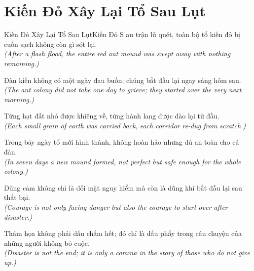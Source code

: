 \section{Kiến Đỏ Xây Lại Tổ Sau Lụt}
\begin{truyen}{Kiến Đỏ Xây Lại Tổ Sau Lụt}{Kiến Đỏ}
S au trận lũ quét, toàn bộ tổ kiến đỏ bị cuốn sạch không còn gì sót lại.\\
\textit{(After a flash flood, the entire red ant mound was swept away with nothing remaining.)}

Đàn kiến không có một ngày đau buồn; chúng bắt đầu lại ngay sáng hôm sau.\\
\textit{(The ant colony did not take one day to grieve; they started over the very next morning.)}

Từng hạt đất nhỏ được khiêng về, từng hành lang được đào lại từ đầu.\\
\textit{(Each small grain of earth was carried back, each corridor re-dug from scratch.)}

Trong bảy ngày tổ mới hình thành, không hoàn hảo nhưng đủ an toàn cho cả đàn.\\
\textit{(In seven days a new mound formed, not perfect but safe enough for the whole colony.)}

Dũng cảm không chỉ là đối mặt nguy hiểm mà còn là dũng khí bắt đầu lại sau thất bại.\\
\textit{(Courage is not only facing danger but also the courage to start over after disaster.)}

\end{truyen}
\begin{baihoc}
  Thảm họa không phải dấu chấm hết; đó chỉ là dấu phẩy trong câu chuyện của những người không bỏ cuộc.\\
  \textit{(Disaster is not the end; it is only a comma in the story of those who do not give up.)}
\end{baihoc}

